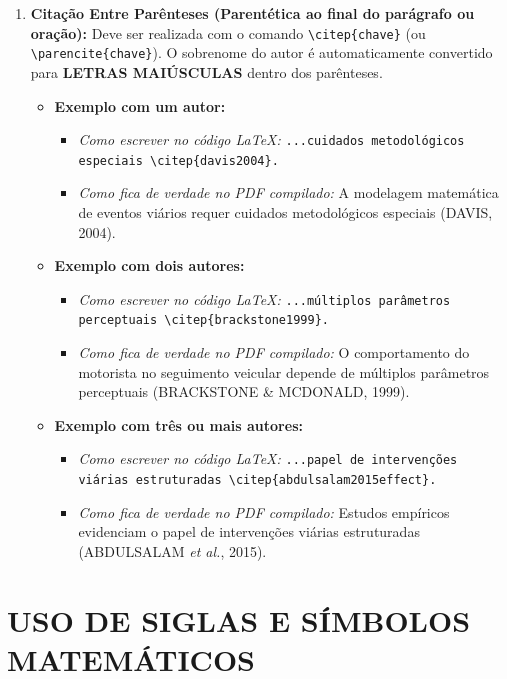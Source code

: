 \begin{enumerate}
  \item \textbf{Citação Entre Parênteses (Parentética ao final do parágrafo ou oração):} Deve ser realizada com o comando \texttt{\textbackslash citep\{chave\}} (ou \texttt{\textbackslash parencite\{chave\}}). O sobrenome do autor é automaticamente convertido para \textbf{LETRAS MAIÚSCULAS} dentro dos parênteses.
  \begin{itemize}
    \item \textbf{Exemplo com um autor:}
    \begin{itemize}
      \item \textit{Como escrever no código \LaTeX:} \texttt{...cuidados metodológicos especiais \textbackslash citep\{davis2004\}.}
      \item \textit{Como fica de verdade no PDF compilado:} A modelagem matemática de eventos viários requer cuidados metodológicos especiais (DAVIS, 2004).
    \end{itemize}

    \item \textbf{Exemplo com dois autores:}
    \begin{itemize}
      \item \textit{Como escrever no código \LaTeX:} \texttt{...múltiplos parâmetros perceptuais \textbackslash citep\{brackstone1999\}.}
      \item \textit{Como fica de verdade no PDF compilado:} O comportamento do motorista no seguimento veicular depende de múltiplos parâmetros perceptuais (BRACKSTONE \& MCDONALD, 1999).
    \end{itemize}

    \item \textbf{Exemplo com três ou mais autores:}
    \begin{itemize}
      \item \textit{Como escrever no código \LaTeX:} \texttt{...papel de intervenções viárias estruturadas \textbackslash citep\{abdulsalam2015effect\}.}
      \item \textit{Como fica de verdade no PDF compilado:} Estudos empíricos evidenciam o papel de intervenções viárias estruturadas (ABDULSALAM \textit{et al.}, 2015).
    \end{itemize}
  \end{itemize}
\end{enumerate}

\section{USO DE SIGLAS E SÍMBOLOS MATEMÁTICOS}
\label{sec:siglas_simbolos}


